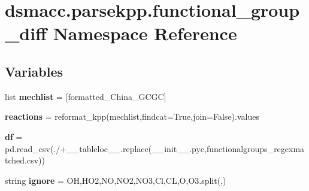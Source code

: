 \hypertarget{namespacedsmacc_1_1parsekpp_1_1functional__group__diff}{}\section{dsmacc.\+parsekpp.\+functional\+\_\+group\+\_\+diff Namespace Reference}
\label{namespacedsmacc_1_1parsekpp_1_1functional__group__diff}
\subsection*{Variables}
\begin{DoxyCompactItemize}
\item 
\mbox{\label{namespacedsmacc_1_1parsekpp_1_1functional__group__diff_aac600d4ee98d5931e132b85a9aa6edfb}} 
list {\bfseries mechlist} = \mbox{[}\textquotesingle{}formatted\+\_\+\+China\+\_\+\+G\+C\+GC\textquotesingle{}\mbox{]}
\item 
\mbox{\label{namespacedsmacc_1_1parsekpp_1_1functional__group__diff_a89cd24ccf6a399d8e2272a2ef7226a30}} 
{\bfseries reactions} = reformat\+\_\+kpp(mechlist,findcat=True,join=False).values
\item 
\mbox{\label{namespacedsmacc_1_1parsekpp_1_1functional__group__diff_a58c114649ffe7eb4da1a6c41b88e5a45}} 
{\bfseries df} = pd.\+read\+\_\+csv(\textquotesingle{}./\textquotesingle{}+\+\_\+\+\_\+tableloc\+\_\+\+\_\+.\+replace(\textquotesingle{}\+\_\+\+\_\+init\+\_\+\+\_\+.\+pyc\textquotesingle{},\textquotesingle{}functionalgroups\+\_\+regexmatched.\+csv\textquotesingle{}))
\item 
\mbox{\label{namespacedsmacc_1_1parsekpp_1_1functional__group__diff_a9fa88cf99c4a9c5236ba1c2ab8187f95}} 
string {\bfseries ignore} = \textquotesingle{}OH,H\+O2,NO,N\+O2,N\+O3,Cl,CL,O,O3\textquotesingle{}.split(\textquotesingle{},\textquotesingle{})
\item 
\mbox{\label{namespacedsmacc_1_1parsekpp_1_1functional__group__diff_ab02b62e251f7683da67e6bc6272b8ead}} 

\end{DoxyCompactItemize}
